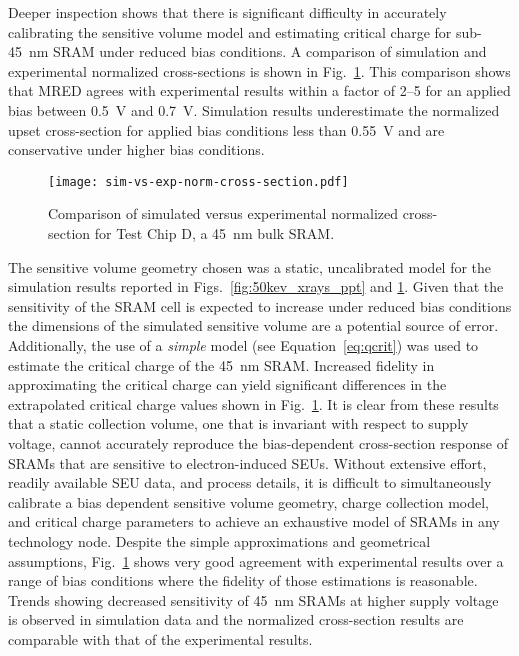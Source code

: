 Deeper inspection shows that there is significant difficulty in accurately calibrating the sensitive volume model and estimating critical charge for sub-45~nm SRAM under reduced bias conditions.
A comparison of simulation and experimental normalized cross-sections is shown in Fig.~\ref{fig:sim-vs-exp-norm-cross-section}.
This comparison shows that MRED agrees with experimental results within a factor of 2--5 for an applied bias between 0.5~V and 0.7~V.
Simulation results underestimate the normalized upset cross-section for applied bias conditions less than 0.55~V and are conservative under higher bias conditions.

\begin{figure}[tb]
    \begin{center}
        \texttt{[image: sim-vs-exp-norm-cross-section.pdf]}
    \end{center}
    \caption{Comparison of simulated versus experimental normalized cross-section for Test Chip D, a 45~nm bulk SRAM.}
    \label{fig:sim-vs-exp-norm-cross-section}
\end{figure}

The sensitive volume geometry chosen was a static, uncalibrated model for the simulation results reported in Figs.~\ref{fig:50kev_xrays_ppt} and \ref{fig:sim-vs-exp-norm-cross-section}.
Given that the sensitivity of the SRAM cell is expected to increase under reduced bias conditions the dimensions of the simulated sensitive volume are a potential source of error.
Additionally, the use of a \emph{simple} model (see Equation~\ref{eq:qcrit}) was used to estimate the critical charge of the 45~nm SRAM.
Increased fidelity in approximating the critical charge can yield significant differences in the extrapolated critical charge values shown in Fig.~\ref{fig:sim-vs-exp-norm-cross-section}.
It is clear from these results that a static collection volume, one that is invariant with respect to supply voltage, cannot accurately reproduce the bias-dependent cross-section response of SRAMs that are sensitive to electron-induced SEUs.
Without extensive effort, readily available SEU data, and process details, it is difficult to simultaneously calibrate a bias dependent sensitive volume geometry, charge collection model, and critical charge parameters to achieve an exhaustive model of SRAMs in any technology node.
Despite the simple approximations and geometrical assumptions, Fig.~\ref{fig:sim-vs-exp-norm-cross-section} shows very good agreement with experimental results over a range of bias conditions where the fidelity of those estimations is reasonable.
Trends showing decreased sensitivity of 45~nm SRAMs at higher supply voltage is observed in simulation data and the normalized cross-section results are comparable with that of the experimental results.


